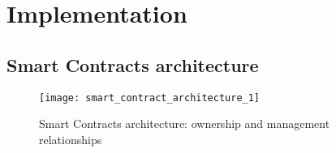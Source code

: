 \documentclass[12pt]{article}
\begin{document}
\section{Implementation}

\subsection{Smart Contracts architecture}

\begin{figure}[h]
    \label{fig:sc-arch-1}
    \texttt{[image: smart\_contract\_architecture\_1]}
    \caption{Smart Contracts architecture: ownership and management relationships}
\end{figure}

\end{document}
